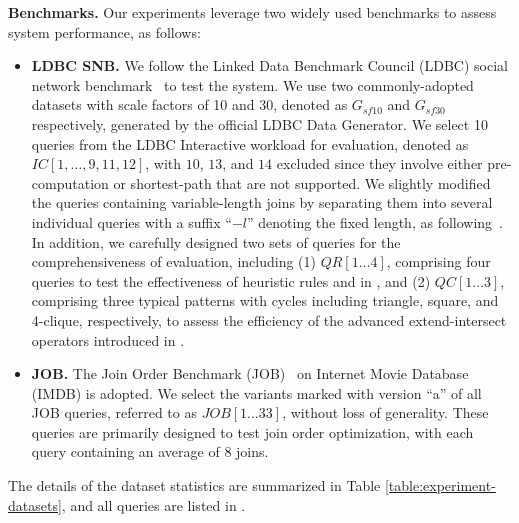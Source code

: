 \noindent\textbf{Benchmarks.} Our experiments leverage two widely used benchmarks to assess system performance, as follows:
\begin{itemize}
    \item \textbf{LDBC SNB.} We follow the Linked Data Benchmark Council (LDBC) social network benchmark~\cite{ldbc_snb} to test the system. We use two commonly-adopted datasets with scale factors of 10 and 30, denoted as $G_{sf10}$ and $G_{sf30}$ respectively, generated by the official LDBC Data Generator.
    We select 10 queries from the LDBC Interactive workload for evaluation, denoted as $IC[1, \ldots, 9, 11, 12]$, with $10$, $13$, and $14$ excluded since they involve either pre-computation or shortest-path that are not supported.
    We slightly modified the queries containing variable-length joins by separating them into several individual queries with a suffix ``$-l$'' denoting the fixed length, as following~\cite{graindb}.
    In addition, we carefully designed two sets of queries for the comprehensiveness of evaluation, including (1) $QR[1\ldots 4]$, comprising four queries to test the effectiveness of heuristic rules \filterrule and \joinfuserule in \name, and (2) $QC[1\ldots 3]$, comprising three typical patterns with cycles including triangle, square, and 4-clique, respectively, to assess the efficiency of the advanced extend-intersect operators introduced in \name.
    \item \textbf{JOB.} The Join Order Benchmark (JOB)~\cite{job_snb} on Internet Movie Database (IMDB) is adopted. We select the variants marked with version ``a'' of all JOB queries, referred to as $JOB[1\ldots 33]$, without loss of generality. These queries are primarily designed to test join order optimization, with each query containing an average of $8$ joins.
\end{itemize}
The details of the dataset statistics are summarized in Table \ref{table:experiment-datasets}, and all queries are listed in .

